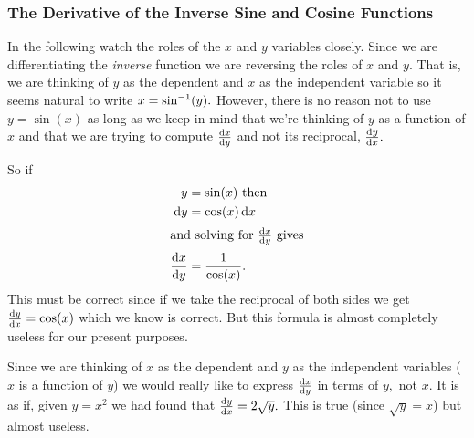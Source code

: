 \subsubsection{The Derivative of the Inverse Sine and Cosine
  Functions}
\label{subsubsec:diff-inverse-sine}
In the following watch the roles of the $x$ and
$y$ variables closely. Since we are differentiating the \emph{inverse}
function we are reversing the roles of $x$ and $y.$ That is, we are
thinking of $y$ as the dependent and $x$ as the independent variable
so it seems natural to write $x = \sin^{-1}(y).$ However, there is
no reason not to use $y=\sin(x)$ as long as we keep in mind that we're
thinking of $y$ as  a function of $x$ and that we are trying to
compute $\frac{\text{d}{x}}{\text{d}{y}}$ and  not its reciprocal, $\frac{\text{d}{y}}{\text{d}{x}}.$ 

So if
\begin{align*}
  y&=\sin(x) \text{ then}\\
  \thinspace{\rm d}y &= \cos(x)\thinspace{\rm d}x\\
\intertext{and solving for $\frac{\text{d}{x}}{\text{d}{y}}$ gives}
  \frac{\text{d}{x}}{\text{d}{y}} &= \frac{1}{\cos(x)}.
\end{align*}
This must be correct since if we take the reciprocal of both sides we
get $ \frac{\text{d}{y}}{\text{d}{x}} = \cos(x)$ which we know is correct. But this
formula is almost completely useless for our present purposes.

Since we are thinking of $x$ as the dependent and $y$ as the
independent variables ($x$ is a function of $y$) we would really like
to express $\frac{\text{d}{x}}{\text{d}{y}}$ in terms of $y,$ not $x.$ It is as if, given
$y=x^2$ we had found that $\frac{\text{d}{y}}{\text{d}{x}}=2\sqrt{y}.$ This is true (since
$\sqrt{y} =x$) but almost useless.




